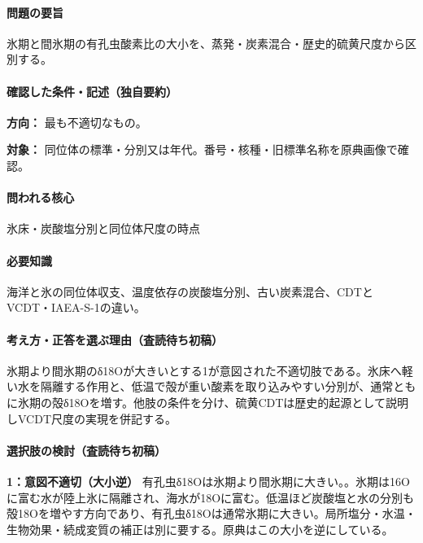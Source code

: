 \paragraph{問題の要旨} 氷期と間氷期の有孔虫酸素比の大小を、蒸発・炭素混合・歴史的硫黄尺度から区別する。

\paragraph{確認した条件・記述（独自要約）}\mbox{}\par

\noindent\textbf{方向：} 最も不適切なもの。\par

\noindent\textbf{対象：} 同位体の標準・分別又は年代。番号・核種・旧標準名称を原典画像で確認。\par

\paragraph{問われる核心} 氷床・炭酸塩分別と同位体尺度の時点

\paragraph{必要知識} 海洋と氷の同位体収支、温度依存の炭酸塩分別、古い炭素混合、CDTとVCDT・IAEA-S-1の違い。

\paragraph{考え方・正答を選ぶ理由（査読待ち初稿）} 氷期より間氷期のδ18Oが大きいとする1が意図された不適切肢である。氷床へ軽い水を隔離する作用と、低温で殻が重い酸素を取り込みやすい分別が、通常ともに氷期の殻δ18Oを増す。他肢の条件を分け、硫黄CDTは歴史的起源として説明しVCDT尺度の実現を併記する。

\paragraph{選択肢の検討（査読待ち初稿）}\mbox{}\par

\noindent\textbf{1：意図不適切（大小逆）} 有孔虫δ18Oは氷期より間氷期に大きい。。氷期は16Oに富む水が陸上氷に隔離され、海水が18Oに富む。低温ほど炭酸塩と水の分別も殻18Oを増やす方向であり、有孔虫δ18Oは通常氷期に大きい。局所塩分・水温・生物効果・続成変質の補正は別に要する。原典はこの大小を逆にしている。\par

